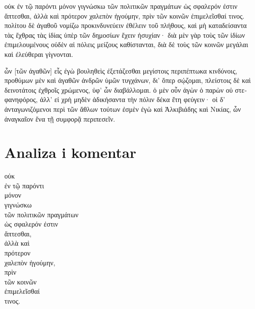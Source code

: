 {\large

\begin{greek}

\noindent οὐκ ἐν τῷ παρόντι μόνον γιγνώσκω τῶν πολιτικῶν πραγμάτων ὡς σφαλερόν ἐστιν ἅπτεσθαι, ἀλλὰ καὶ πρότερον χαλεπὸν ἡγούμην, πρὶν τῶν κοινῶν ἐπιμελεῖσθαί τινος. πολίτου δὲ ἀγαθοῦ νομίζω προκινδυνεύειν ἐθέλειν τοῦ πλήθους, καὶ μὴ καταδείσαντα τὰς ἔχθρας τὰς ἰδίας ὑπὲρ τῶν δημοσίων ἔχειν ἡσυχίαν· διὰ μὲν γὰρ τοὺς τῶν ἰδίων ἐπιμελουμένους οὐδὲν αἱ πόλεις μείζους καθίστανται, διὰ δὲ τοὺς τῶν κοινῶν μεγάλαι καὶ ἐλεύθεραι γίγνονται.

ὧν [τῶν ἀγαθῶν] εἷς ἐγὼ βουληθεὶς ἐξετάζεσθαι μεγίστοις περιπέπτωκα κινδύνοις, προθύμων μὲν καὶ ἀγαθῶν ἀνδρῶν ὑμῶν τυγχάνων, δι' ὅπερ σῴζομαι, πλείστοις δὲ καὶ δεινοτάτοις ἐχθροῖς χρώμενος, ὑφ' ὧν διαβάλλομαι. ὁ μὲν οὖν ἀγὼν ὁ παρὼν οὐ στεφανηφόρος, ἀλλ' εἰ χρὴ μηδὲν ἀδικήσαντα τὴν πόλιν δέκα ἔτη φεύγειν· οἱ δ' ἀνταγωνιζόμενοι περὶ τῶν ἄθλων τούτων ἐσμὲν ἐγὼ καὶ Ἀλκιβιάδης καὶ Νικίας, ὧν ἀναγκαῖον ἕνα τῇ συμφορᾷ περιπεσεῖν.

\end{greek}

}


\section*{Analiza i komentar}


{\large
\begin{greek}
\noindent οὐκ \\
\tabto{2em} ἐν τῷ παρόντι \\
μόνον \\
γιγνώσκω \\
\tabto{6em} τῶν πολιτικῶν πραγμάτων \\
\tabto{2em} ὡς σφαλερόν ἐστιν \\
\tabto{4em} ἅπτεσθαι, \\
ἀλλὰ καὶ \\
\tabto{2em} πρότερον \\
χαλεπὸν ἡγούμην, \\
\tabto{2em} πρὶν \\
\tabto{6em} τῶν κοινῶν \\
\tabto{2em} ἐπιμελεῖσθαί \\
\tabto{4em} τινος.\\

\end{greek}
}

